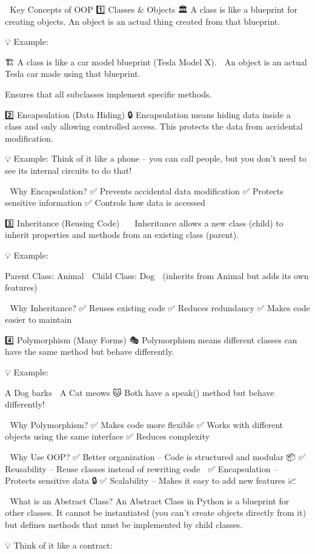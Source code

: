🎯 Key Concepts of OOP
1️⃣ Classes & Objects 🏛️
A class is like a blueprint for creating objects.
An object is an actual thing created from that blueprint.

💡 Example:

🏗️ A class is like a car model blueprint (Tesla Model X).
🚗 An object is an actual Tesla car made using that blueprint.

Ensures that all subclasses implement specific methods.

2️⃣ Encapsulation (Data Hiding) 🔒
Encapsulation means hiding data inside a class and only allowing controlled access. This protects the data from accidental modification.

💡 Example: Think of it like a phone – you can call people, but you don’t need to see its internal circuits to do that!

🔹 Why Encapsulation?
✅ Prevents accidental data modification
✅ Protects sensitive information
✅ Controls how data is accessed

3️⃣ Inheritance (Reusing Code) 👨‍👩‍👧‍👦
Inheritance allows a new class (child) to inherit properties and methods from an existing class (parent).

💡 Example:

Parent Class: Animal 🦁
Child Class: Dog 🐶 (inherits from Animal but adds its own features)

🔹 Why Inheritance?
✅ Reuses existing code
✅ Reduces redundancy
✅ Makes code easier to maintain

4️⃣ Polymorphism (Many Forms) 🎭
Polymorphism means different classes can have the same method but behave differently.

💡 Example:

A Dog barks 🐶
A Cat meows 🐱
Both have a speak() method but behave differently!

🔹 Why Polymorphism?
✅ Makes code more flexible
✅ Works with different objects using the same interface
✅ Reduces complexity

🎯 Why Use OOP?
✅ Better organization – Code is structured and modular 📦
✅ Reusability – Reuse classes instead of rewriting code 🔁
✅ Encapsulation – Protects sensitive data 🔒
✅ Scalability – Makes it easy to add new features 📈

🔹 What is an Abstract Class?
An Abstract Class in Python is a blueprint for other classes. It cannot be instantiated (you can't create objects directly from it) but defines methods that must be implemented by child classes.

💡 Think of it like a contract:

